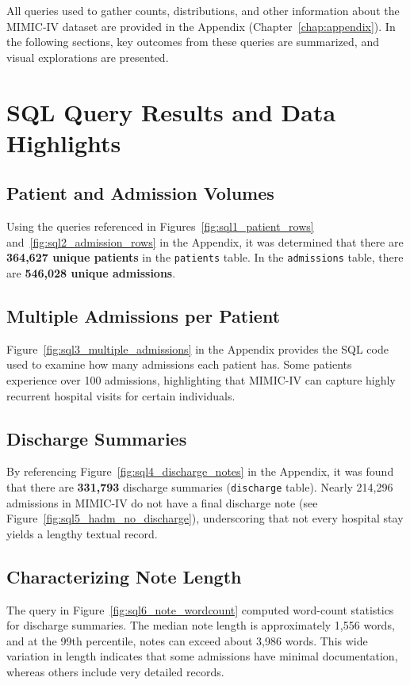 \vspace{5pt}
\noindent
All queries used to gather counts, distributions, and other information about the MIMIC-IV dataset are provided in the Appendix (Chapter~\ref{chap:appendix}). In the following sections, key outcomes from these queries are summarized, and visual explorations are presented.

\section{SQL Query Results and Data Highlights}

\subsection{Patient and Admission Volumes}
\noindent
Using the queries referenced in Figures~\ref{fig:sql1_patient_rows} and~\ref{fig:sql2_admission_rows} in the Appendix, it was determined that there are \textbf{364,627 unique patients} in the \texttt{patients} table. In the \texttt{admissions} table, there are \textbf{546,028 unique admissions}. 

\subsection{Multiple Admissions per Patient}
\noindent
Figure~\ref{fig:sql3_multiple_admissions} in the Appendix provides the SQL code used to examine how many admissions each patient has. Some patients experience over 100 admissions, highlighting that MIMIC-IV can capture highly recurrent hospital visits for certain individuals.

\subsection{Discharge Summaries}
\noindent
By referencing Figure~\ref{fig:sql4_discharge_notes} in the Appendix, it was found that there are \textbf{331,793} discharge summaries (\texttt{discharge} table). Nearly 214,296 admissions in MIMIC-IV do not have a final discharge note (see Figure~\ref{fig:sql5_hadm_no_discharge}), underscoring that not every hospital stay yields a lengthy textual record.

\subsection{Characterizing Note Length}
\noindent
The query in Figure~\ref{fig:sql6_note_wordcount} computed word-count statistics for discharge summaries. The median note length is approximately 1{,}556 words, and at the 99th percentile, notes can exceed about 3{,}986 words. This wide variation in length indicates that some admissions have minimal documentation, whereas others include very detailed records.

